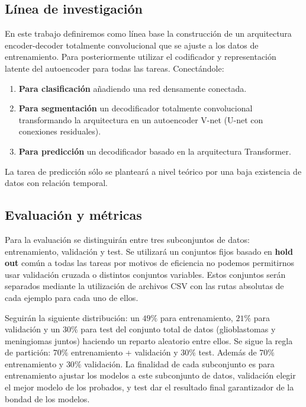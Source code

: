 \subsection{Línea de investigación}

 En este trabajo definiremos como línea base la construcción de un arquitectura encoder-decoder totalmente convolucional que se ajuste a los datos de entrenamiento. Para posteriormente utilizar el codificador y representación latente del autoencoder para todas las tareas. Conectándole:
 
 \begin{enumerate}
 	\item \textbf{Para clasificación} añadiendo una red densamente conectada. 
 	\item \textbf{Para segmentación}  un decodificador totalmente convolucional transformando la arquitectura en un autoencoder V-net (U-net con conexiones residuales).
 	\item \textbf{Para predicción} un decodificador basado en la arquitectura Transformer.
 	
 \end{enumerate}
 
 La tarea de predicción sólo se planteará a nivel teórico por una baja existencia de datos con relación temporal. 

\subsection{Evaluación y métricas}

Para la evaluación se distinguirán entre tres subconjuntos de datos: entrenamiento, validación y test. Se utilizará un conjuntos fijos basado en \textbf{hold out} común a todas las tareas por motivos de eficiencia no podemos permitirnos usar validación cruzada o distintos conjuntos variables. Estos conjuntos serán separados mediante la utilización de archivos CSV con las rutas absolutas de cada ejemplo para cada uno de ellos. 

Seguirán la siguiente distribución: un $49 \%$ para entrenamiento, $21 \%$ para validación y un $30 \%$ para test del conjunto total de datos (glioblastomas y meningiomas juntos) haciendo un reparto aleatorio entre ellos. Se sigue la regla de partición: $70 \%$ entrenamiento + validación y $30 \%$ test. Además de $70 \%$ entrenamiento y $30 \%$ validación. La finalidad de cada subconjunto es para entrenamiento ajustar los modelos a este subconjunto de datos, validación elegir el mejor modelo de los probados, y test dar el resultado final garantizador de la bondad de los modelos.

